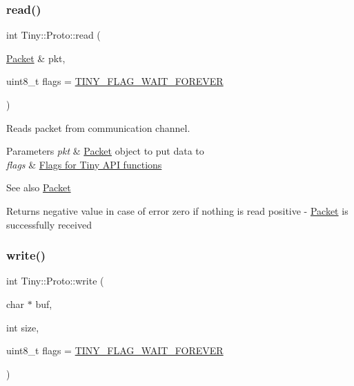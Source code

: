 \subsubsection{\texorpdfstring{read()}{read()}\hspace{0.1cm}{\footnotesize\ttfamily [2/2]}}
{\footnotesize\ttfamily int Tiny\+::\+Proto\+::read (\begin{DoxyParamCaption}\item[{\hyperlink{classTiny_1_1Packet}{Packet} \&}]{pkt,  }\item[{uint8\+\_\+t}]{flags = {\ttfamily \hyperlink{group__FLAGS__GROUP_ga3a34267804581c5709d03f52d232b307}{T\+I\+N\+Y\+\_\+\+F\+L\+A\+G\+\_\+\+W\+A\+I\+T\+\_\+\+F\+O\+R\+E\+V\+ER}} }\end{DoxyParamCaption})}

Reads packet from communication channel. 
\begin{DoxyParams}{Parameters}
{\em pkt} & \hyperlink{classTiny_1_1Packet}{Packet} object to put data to \\
\hline
{\em flags} & \hyperlink{group__FLAGS__GROUP}{Flags for Tiny A\+PI functions} \\
\hline
\end{DoxyParams}
\begin{DoxySeeAlso}{See also}
\hyperlink{classTiny_1_1Packet}{Packet} 
\end{DoxySeeAlso}
\begin{DoxyReturn}{Returns}
negative value in case of error zero if nothing is read positive -\/ \hyperlink{classTiny_1_1Packet}{Packet} is successfully received 
\end{DoxyReturn}
\mbox{\label{classTiny_1_1Proto_a46fbc8b8681431b9b0a9a4b953a8dc33}} 
\subsubsection{\texorpdfstring{write()}{write()}\hspace{0.1cm}{\footnotesize\ttfamily [1/2]}}
{\footnotesize\ttfamily int Tiny\+::\+Proto\+::write (\begin{DoxyParamCaption}\item[{char $\ast$}]{buf,  }\item[{int}]{size,  }\item[{uint8\+\_\+t}]{flags = {\ttfamily \hyperlink{group__FLAGS__GROUP_ga3a34267804581c5709d03f52d232b307}{T\+I\+N\+Y\+\_\+\+F\+L\+A\+G\+\_\+\+W\+A\+I\+T\+\_\+\+F\+O\+R\+E\+V\+ER}} }\end{DoxyParamCaption})}

